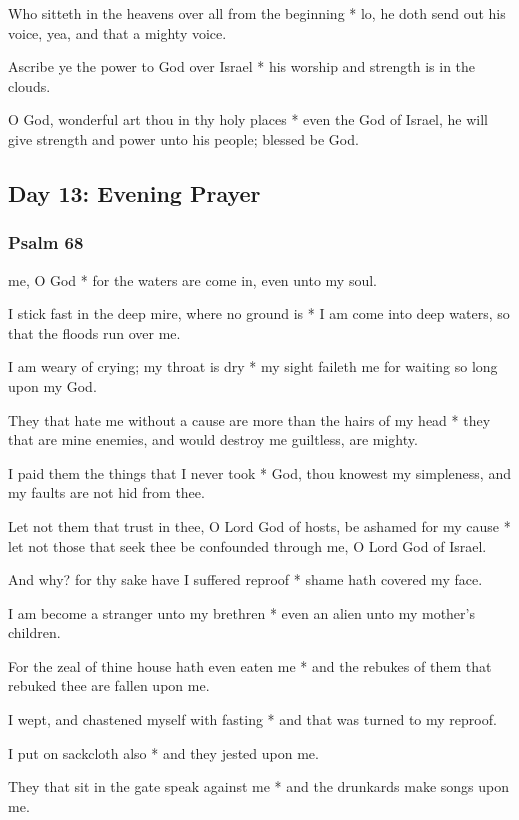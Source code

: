 Who sitteth in the heavens over all from the beginning * lo, he doth send out his voice, yea, and that a mighty voice.

Ascribe ye the power to God over Israel * his worship and strength is in the clouds.

O God, wonderful art thou in thy holy places * even the God of Israel, he will give strength and power unto his people; blessed be God.

\subsection{Day 13: Evening Prayer}

\subsubsection{Psalm 68}


 me, O God * for the waters are come in, even unto my soul.

I stick fast in the deep mire, where no ground is * I am come into deep waters, so that the floods run over me.

I am weary of crying; my throat is dry * my sight faileth me for waiting so long upon my God.

They that hate me without a cause are more than the hairs of my head * they that are mine enemies, and would destroy me guiltless, are mighty.

I paid them the things that I never took * God, thou knowest my simpleness, and my faults are not hid from thee.

Let not them that trust in thee, O Lord God of hosts, be ashamed for my cause * let not those that seek thee be confounded through me, O Lord God of Israel.

And why? for thy sake have I suffered reproof * shame hath covered my face.

I am become a stranger unto my brethren * even an alien unto my mother's children.

For the zeal of thine house hath even eaten me * and the rebukes of them that rebuked thee are fallen upon me.

I wept, and chastened myself with fasting * and that was turned to my reproof.

I put on sackcloth also * and they jested upon me.

They that sit in the gate speak against me * and the drunkards make songs upon me.

